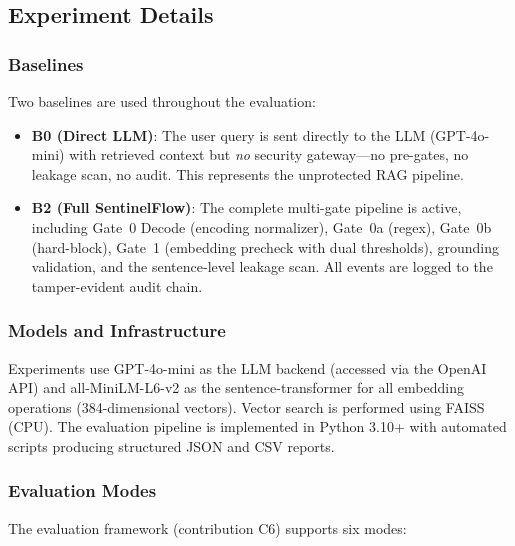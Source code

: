 \documentclass[journal]{IEEEtran}
\begin{document}
\subsection{Experiment Details}
\label{Sect:Experiment_Details}

\subsubsection{Baselines}

Two baselines are used throughout the evaluation:

\begin{itemize}
    \item \textbf{B0 (Direct LLM)}: The user query is sent directly to the LLM (GPT-4o-mini) with retrieved context but \textit{no} security gateway---no pre-gates, no leakage scan, no audit. This represents the unprotected RAG pipeline.
    \item \textbf{B2 (Full SentinelFlow)}: The complete multi-gate pipeline is active, including Gate~0 Decode (encoding normalizer), Gate~0a (regex), Gate~0b (hard-block), Gate~1 (embedding precheck with dual thresholds), grounding validation, and the sentence-level leakage scan. All events are logged to the tamper-evident audit chain.
\end{itemize}

\subsubsection{Models and Infrastructure}

Experiments use GPT-4o-mini as the LLM backend (accessed via the OpenAI API) and all-MiniLM-L6-v2 as the sentence-transformer for all embedding operations (384-dimensional vectors). Vector search is performed using FAISS (CPU). The evaluation pipeline is implemented in Python 3.10+ with automated scripts producing structured JSON and CSV reports.

\subsubsection{Evaluation Modes}

The evaluation framework (contribution C6) supports six modes:
\end{document}
